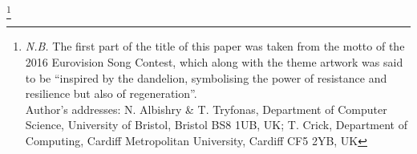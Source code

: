 \documentclass[sigconf]{acmart}
\begin{document}
%




\thanks{{\emph{N.B.}} The first part of the title of this paper was
taken from the motto of the 2016 Eurovision Song Contest, which along
with the theme artwork was said to be ``inspired by the dandelion,
symbolising the power of resistance and resilience but also of
regeneration''.\\

Author's addresses: N. Albishry \& T. Tryfonas, Department of
Computer Science, University of Bristol, Bristol BS8 1UB, UK;
T. Crick, Department of Computing, Cardiff Metropolitan University,
Cardiff CF5 2YB, UK}


\maketitle




 
\end{document}
